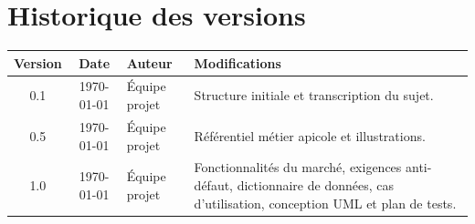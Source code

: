 \documentclass[11pt,a4paper]{report}
\begin{document}
\section*{Historique des versions}
\begin{center}
\begin{tabular}{ccp{3cm}p{6.5cm}}
\toprule
\textbf{Version} & \textbf{Date} & \textbf{Auteur} & \textbf{Modifications} \\
\midrule
0.1 & \today & Équipe projet & Structure initiale et transcription du sujet. \\
0.5 & \today & Équipe projet & Référentiel métier apicole et illustrations. \\
1.0 & \today & Équipe projet & Fonctionnalités du marché, exigences anti-défaut, dictionnaire de données, cas d'utilisation, conception UML et plan de tests. \\
\bottomrule
\end{tabular}
\end{center}
\clearpage














\appendix








\end{document}
